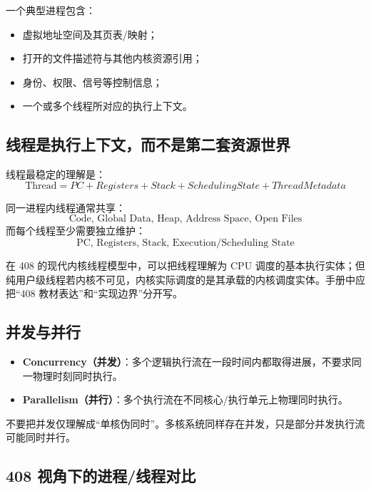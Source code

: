 \documentclass[11pt,a4paper]{ctexart}
\newcommand{\kw}[1]{\textbf{#1}}
\begin{document}
一个典型进程包含：
\begin{itemize}
\item 虚拟地址空间及其页表/映射；
\item 打开的文件描述符与其他内核资源引用；
\item 身份、权限、信号等控制信息；
\item 一个或多个线程所对应的执行上下文。
\end{itemize}

\subsection{线程是执行上下文，而不是第二套资源世界}

线程最稳定的理解是：
\[
\boxed{\text{Thread}=PC+Registers+Stack+Scheduling State+Thread Metadata}
\]

同一进程内线程通常共享：
\[
\text{Code, Global Data, Heap, Address Space, Open Files}
\]
而每个线程至少需要独立维护：
\[
\text{PC, Registers, Stack, Execution/Scheduling State}
\]

\begin{warn}
在 408 的现代内核线程模型中，可以把线程理解为 CPU 调度的基本执行实体；但纯用户级线程若内核不可见，内核实际调度的是其承载的内核调度实体。手册中应把“408 教材表达”和“实现边界”分开写。
\end{warn}

\subsection{并发与并行}

\begin{itemize}
\item \kw{Concurrency（并发）}：多个逻辑执行流在一段时间内都取得进展，不要求同一物理时刻同时执行。
\item \kw{Parallelism（并行）}：多个执行流在不同核心/执行单元上物理同时执行。
\end{itemize}

不要把并发仅理解成“单核伪同时”。多核系统同样存在并发，只是部分并发执行流可能同时并行。

\subsection{408 视角下的进程/线程对比}
\end{document}
